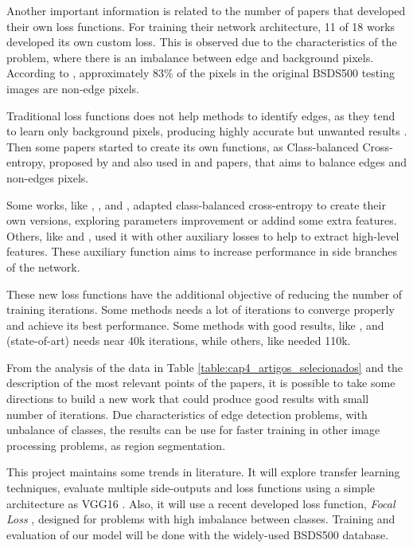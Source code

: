 Another important information is related to the number of papers that developed their own loss functions.
For training their network architecture, 11 of 18 works developed its own custom loss.
This is observed due to the characteristics of the problem, where there is an imbalance between edge and background pixels.
According to \cite{ReExtraction:Wen201884}, approximately 83\% of the pixels in the original BSDS500 testing images are non-edge pixels.

Traditional loss functions does not help methods to identify edges, as they tend to learn only background pixels, producing highly accurate but unwanted results \cite{HED:2015}.
Then some papers started to create its own functions, as Class-balanced Cross-entropy, proposed by \cite{HED:2015} and also used in \cite{Cumulative:Song20181847} and \cite{CrispBoundaries:2018:Deng2018570} papers, that aims to balance edges and non-edges pixels.

Some works, like \cite{Kokkinos:2016}, \cite{COB:2018:7917294}, \cite{RCF:2019} and \cite{ReExtraction:Wen201884}, adapted class-balanced cross-entropy to create their own versions, exploring parameters improvement or addind some extra features.
Others, like \cite{LearningHybrid:Hu2018377} and \cite{He:2019}, used it with other auxiliary losses to help to extract high-level features.
These auxiliary function aims to increase performance in side branches of the network.

These new loss functions have the additional objective of reducing the number of training iterations.
Some methods needs a lot of iterations to converge properly and achieve its best performance.
Some methods with good results, like \cite{RCF:2019}, \cite{Yang:2019} and \cite{He:2019} (state-of-art) needs near 40k iterations, while others, like \cite{ProeminentEdge:2018:Cai2018} needed 110k.

From the analysis of the data in Table \ref{table:cap4_artigos_selecionados} and the description of the most relevant points of the papers, it is possible to take some directions to build a new work that could produce good results with small number of iterations.
Due characteristics of edge detection problems, with unbalance of classes, the results can be use for faster training in other image processing problems, as region segmentation.

This project maintains some trends in literature.
It will explore transfer learning techniques, evaluate multiple side-outputs and loss functions using a simple architecture as VGG16 \cite{VGGNET:2014}.
Also, it will use a recent developed loss function, \textit{Focal Loss} \cite{Lin:2017}, designed for problems with high imbalance between classes.
Training and evaluation of our model will be done with the widely-used BSDS500 database.

